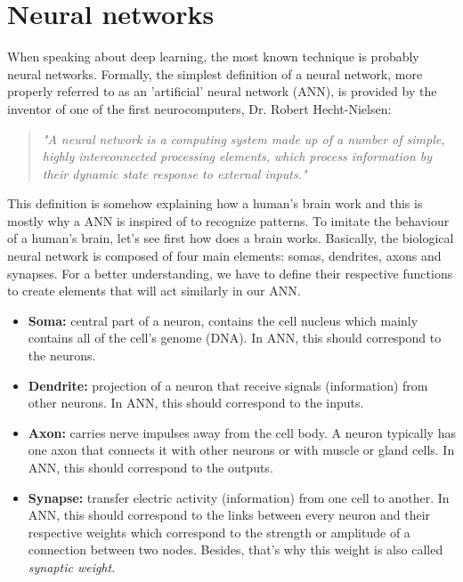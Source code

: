 \documentclass[11pt, openany]{report}
\theoremstyle{plain}
\theoremstyle{definition}
\theoremstyle{remark}
\begin{document}
\section{Neural networks} \label{sec:neural-networks}
When speaking about deep learning, the most known technique is probably neural networks. Formally, the simplest definition of a neural network, more properly referred to as an 'artificial' neural network (ANN), is provided by the inventor of one of the first neurocomputers, Dr. Robert Hecht-Nielsen:  

\begin{quote}
\textit{"A neural network is a computing system made up of a number of simple, highly interconnected processing elements, which process information by their dynamic state response to external inputs."}
\end{quote}    

This definition is somehow explaining how a human's brain work and this is mostly why a ANN is inspired of to recognize patterns. To imitate the behaviour of a human's brain, let's see first how does a brain works. Basically, the biological neural network is composed of four main elements:
somas, dendrites, axons and synapses. For a better understanding, we have to define their respective functions to create elements that will act similarly in our ANN.
\begin{itemize}
\item \textbf{Soma:} central part of a neuron, contains the cell nucleus which mainly contains all of the cell's genome (DNA). In ANN, this should correspond to the neurons. 
\item \textbf{Dendrite:} projection of a neuron that receive signals (information) from other neurons. In ANN, this should correspond to the inputs. 
\item \textbf{Axon:} carries nerve impulses away from the cell body. A neuron typically has one axon that connects it with other neurons or with muscle or gland cells. In ANN, this should correspond to the outputs. 
\item \textbf{Synapse:} transfer electric activity (information) from one cell to another.  In ANN, this should correspond to the links between every neuron and their respective weights which correspond to the strength or amplitude of a connection between two nodes. Besides, that's why this weight is also called \textit{synaptic weight}. 
\end{itemize} 
\end{document}
